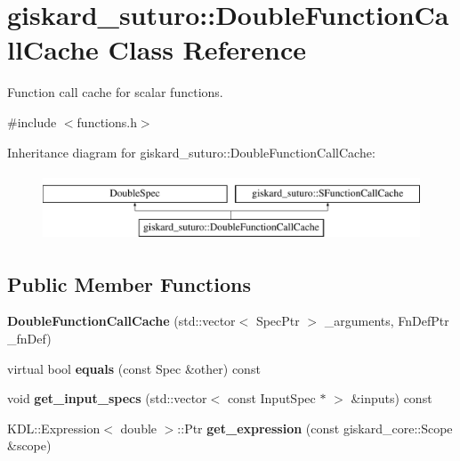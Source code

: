 \hypertarget{classgiskard__suturo_1_1DoubleFunctionCallCache}{\section{giskard\-\_\-suturo\-:\-:Double\-Function\-Call\-Cache Class Reference}
\label{classgiskard__suturo_1_1DoubleFunctionCallCache}
}


Function call cache for scalar functions.  




{\ttfamily \#include $<$functions.\-h$>$}

Inheritance diagram for giskard\-\_\-suturo\-:\-:Double\-Function\-Call\-Cache\-:\begin{figure}[H]
\begin{center}
\leavevmode
\includegraphics[height=2.000000cm]{classgiskard__suturo_1_1DoubleFunctionCallCache}
\end{center}
\end{figure}
\subsection*{Public Member Functions}
\begin{DoxyCompactItemize}
\item 
\hypertarget{classgiskard__suturo_1_1DoubleFunctionCallCache_a34971a65c735c787f4bf89f6d94837ab}{{\bfseries Double\-Function\-Call\-Cache} (std\-::vector$<$ Spec\-Ptr $>$ \-\_\-arguments, Fn\-Def\-Ptr \-\_\-fn\-Def)}\label{classgiskard__suturo_1_1DoubleFunctionCallCache_a34971a65c735c787f4bf89f6d94837ab}

\item 
\hypertarget{classgiskard__suturo_1_1DoubleFunctionCallCache_a2dba5914aa14674c8772b3256c3ef43e}{virtual bool {\bfseries equals} (const Spec \&other) const }\label{classgiskard__suturo_1_1DoubleFunctionCallCache_a2dba5914aa14674c8772b3256c3ef43e}

\item 
\hypertarget{classgiskard__suturo_1_1DoubleFunctionCallCache_ac0da88d76e96612b38c98eea54835e12}{void {\bfseries get\-\_\-input\-\_\-specs} (std\-::vector$<$ const Input\-Spec $\ast$ $>$ \&inputs) const }\label{classgiskard__suturo_1_1DoubleFunctionCallCache_ac0da88d76e96612b38c98eea54835e12}

\item 
\hypertarget{classgiskard__suturo_1_1DoubleFunctionCallCache_a71ab6c47e9dd1f1143b9e82f315c3f53}{K\-D\-L\-::\-Expression$<$ double $>$\-::Ptr {\bfseries get\-\_\-expression} (const giskard\-\_\-core\-::\-Scope \&scope)}\label{classgiskard__suturo_1_1DoubleFunctionCallCache_a71ab6c47e9dd1f1143b9e82f315c3f53}

\end{DoxyCompactItemize}
